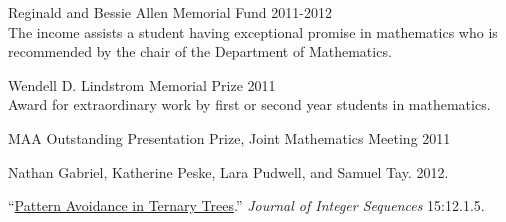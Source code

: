 \documentclass[11pt,article,oneside]{memoir}
\begin{document}
\ind Reginald and Bessie Allen Memorial Fund \hfill {\small 2011-2012} \\
\footnotesize
  The income assists a student having exceptional promise in mathematics who is
  recommended by the chair of the Department of Mathematics.
\normalsize

\ind Wendell D. Lindstrom Memorial Prize \hfill {\small 2011} \\
\footnotesize
  Award for extraordinary work by first or second year students in mathematics.
\normalsize

\ind MAA Outstanding Presentation Prize, Joint Mathematics Meeting \hfill {\small 2011} \\


\ind Nathan Gabriel, Katherine Peske, Lara Pudwell, and Samuel Tay. 2012.

\noindent ``\href{http://arxiv.org/abs/1110.2225}{Pattern Avoidance in Ternary Trees}.''
  \emph{Journal of Integer Sequences} 15:12.1.5. \vspace{0.05in}
\end{document}
